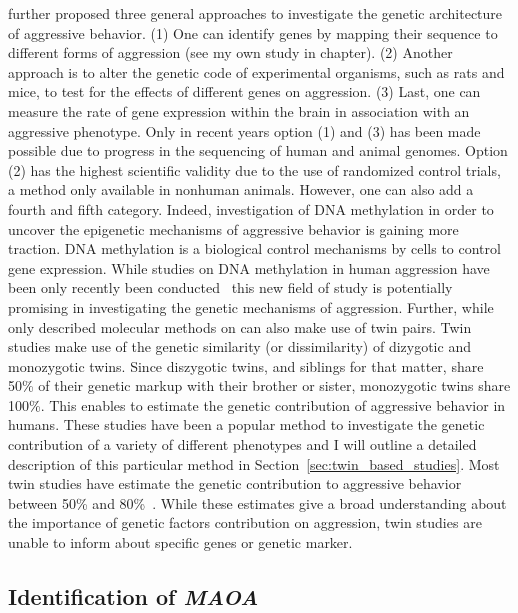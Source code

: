 \citet{Maxson2005} further proposed three general approaches to investigate the genetic architecture of aggressive behavior.
(1) One can identify genes by mapping their sequence to different forms of aggression (see my own study in chapter). %
(2) Another approach is to alter the genetic code of experimental organisms, such as rats and mice, to test for the effects of different genes on aggression.
(3) Last, one can measure the rate of gene expression within the brain in association with an aggressive phenotype.
Only in recent years option (1) and (3) has been made possible due to progress in the sequencing of human and animal genomes.
Option (2) has the highest scientific validity due to the use of randomized control trials, a method only available in nonhuman animals.
However, one can also add a fourth and fifth category.
Indeed, investigation of DNA methylation in order to uncover the epigenetic mechanisms of aggressive behavior is gaining more traction.
DNA methylation is a biological control mechanisms by cells to control gene expression.
While studies on DNA methylation in human aggression have been only recently been conducted~\cite{VanDongen2015a} this new field of study is potentially promising in investigating the genetic mechanisms of aggression.
Further, while~\citet{Maxson2005} only described molecular methods on can also make use of twin pairs.
Twin studies make use of the genetic similarity (or dissimilarity) of dizygotic and monozygotic twins.
Since diszygotic twins, and siblings for that matter, share 50\% of their genetic markup with their brother or sister, monozygotic twins share 100\%.
This enables to estimate the genetic contribution of aggressive behavior in humans.
These studies have been a popular method to investigate the genetic contribution of a variety of different phenotypes and I will outline a detailed description of this particular method in Section~\ref{sec:twin_based_studies}. 
Most twin studies have estimate the genetic contribution to aggressive behavior between 50\% and 80\%~\cite{Porsch2016}.
While these estimates give a broad understanding about the importance of genetic factors contribution on aggression, twin studies are unable to inform about specific genes or genetic marker.

\subsection{Identification of \textit{MAOA}}
\label{sub:identification_of_MAOA}

